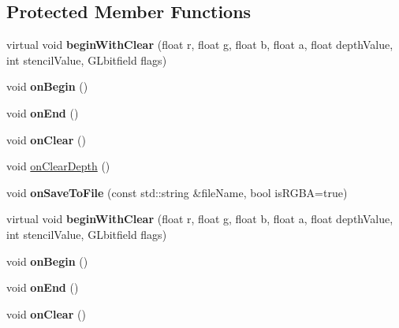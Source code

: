 \subsection*{Protected Member Functions}
\begin{DoxyCompactItemize}
\item 
\mbox{\label{classRenderTexture_a3914c94c1c3bbf56adf5edf18739dd22}} 
virtual void {\bfseries begin\+With\+Clear} (float r, float g, float b, float a, float depth\+Value, int stencil\+Value, G\+Lbitfield flags)
\item 
\mbox{\label{classRenderTexture_a705564fcdb4eab26f8e0ecf0a451b264}} 
void {\bfseries on\+Begin} ()
\item 
\mbox{\label{classRenderTexture_a40613e7736ef172d16f665b67f1d0678}} 
void {\bfseries on\+End} ()
\item 
\mbox{\label{classRenderTexture_aa79c1fb27ab8adcc88fdf00bf8cd3973}} 
void {\bfseries on\+Clear} ()
\item 
void \hyperlink{classRenderTexture_ac94c214b8570de378cfcc9951e853e98}{on\+Clear\+Depth} ()
\item 
\mbox{\label{classRenderTexture_aec7f32d06cde6a17b7325d21f27e069e}} 
void {\bfseries on\+Save\+To\+File} (const std\+::string \&file\+Name, bool is\+R\+G\+BA=true)
\item 
\mbox{\label{classRenderTexture_a3767424e22b593f97c3f80a72c875940}} 
virtual void {\bfseries begin\+With\+Clear} (float r, float g, float b, float a, float depth\+Value, int stencil\+Value, G\+Lbitfield flags)
\item 
\mbox{\label{classRenderTexture_a705564fcdb4eab26f8e0ecf0a451b264}} 
void {\bfseries on\+Begin} ()
\item 
\mbox{\label{classRenderTexture_a40613e7736ef172d16f665b67f1d0678}} 
void {\bfseries on\+End} ()
\item 
\mbox{\label{classRenderTexture_aa79c1fb27ab8adcc88fdf00bf8cd3973}} 
void {\bfseries on\+Clear} ()
\item 

\end{DoxyCompactItemize}
